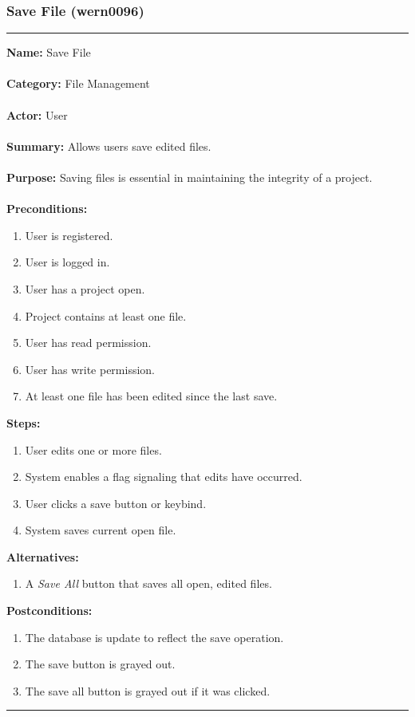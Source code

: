 \documentclass[11pt]{report}
\begin{document}
\subsubsection{Save File (wern0096)}
\vspace{2pt}
\hrule
\vspace{8pt}
	\noindent\textbf{Name:} Save File \\ \\
	\textbf{Category:} File Management \\ \\
	\textbf{Actor:} User \\ \\
	\textbf{Summary:} Allows users save edited files. \\ \\
	\textbf{Purpose:} Saving files is essential in maintaining the integrity of a project. \\ \\
	\textbf{Preconditions:} 
	\begin{enumerate}
		\item User is registered.
		\item User is logged in.
		\item User has a project open.
		\item Project contains at least one file.
		\item User has read permission.
		\item User has write permission.
		\item At least one file has been edited since the last save.
	\end{enumerate}		
	\textbf{Steps:}
	\begin{enumerate}
		\item User edits one or more files.
		\item System enables a flag signaling that edits have occurred.
		\item User clicks a save button or keybind.
		\item System saves current open file.
	\end{enumerate}	
	\textbf{Alternatives:} 
	\begin{enumerate}
		\item A \textit{Save All} button that saves all open, edited files.
	\end{enumerate}
	\textbf{Postconditions:}
	\begin{enumerate}
		\item The database is update to reflect the save operation.
		\item The save button is grayed out.
		\item The save all button is grayed out if it was clicked.
	\end{enumerate}
\vspace{8pt}
\hrule
\newpage
\end{document}
